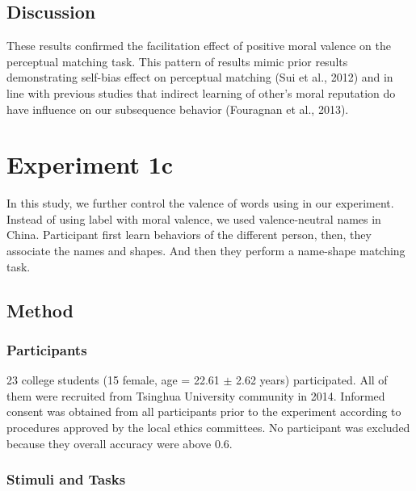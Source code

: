 \documentclass[man]{apa6}
\begin{document}
\hypertarget{discussion}{%
\subsection{Discussion}\label{discussion}}

These results confirmed the facilitation effect of positive moral valence on the perceptual matching task. This pattern of results mimic prior results demonstrating self-bias effect on perceptual matching (Sui et al., 2012) and in line with previous studies that indirect learning of other's moral reputation do have influence on our subsequence behavior (Fouragnan et al., 2013).

\hypertarget{experiment-1c}{%
\section{Experiment 1c}\label{experiment-1c}}

In this study, we further control the valence of words using in our experiment. Instead of using label with moral valence, we used valence-neutral names in China. Participant first learn behaviors of the different person, then, they associate the names and shapes. And then they perform a name-shape matching task.

\hypertarget{method-1}{%
\subsection{Method}\label{method-1}}

\hypertarget{participants-2}{%
\subsubsection{Participants}\label{participants-2}}

23 college students (15 female, age = 22.61 \(\pm\) 2.62 years) participated. All of them were recruited from Tsinghua University community in 2014. Informed consent was obtained from all participants prior to the experiment according to procedures approved by the local ethics committees. No participant was excluded because they overall accuracy were above 0.6.

\hypertarget{stimuli-and-tasks-2}{%
\subsubsection{Stimuli and Tasks}\label{stimuli-and-tasks-2}}
\end{document}
